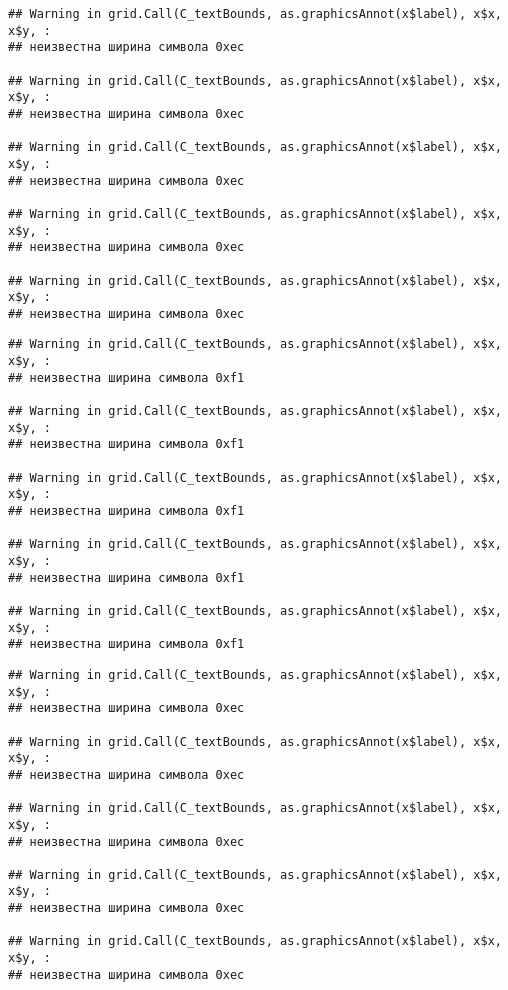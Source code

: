 \documentclass[
]{article}
\begin{document}
\begin{verbatim}
## Warning in grid.Call(C_textBounds, as.graphicsAnnot(x$label), x$x, x$y, :
## неизвестна ширина символа 0xec

## Warning in grid.Call(C_textBounds, as.graphicsAnnot(x$label), x$x, x$y, :
## неизвестна ширина символа 0xec

## Warning in grid.Call(C_textBounds, as.graphicsAnnot(x$label), x$x, x$y, :
## неизвестна ширина символа 0xec

## Warning in grid.Call(C_textBounds, as.graphicsAnnot(x$label), x$x, x$y, :
## неизвестна ширина символа 0xec

## Warning in grid.Call(C_textBounds, as.graphicsAnnot(x$label), x$x, x$y, :
## неизвестна ширина символа 0xec
\end{verbatim}

\begin{verbatim}
## Warning in grid.Call(C_textBounds, as.graphicsAnnot(x$label), x$x, x$y, :
## неизвестна ширина символа 0xf1

## Warning in grid.Call(C_textBounds, as.graphicsAnnot(x$label), x$x, x$y, :
## неизвестна ширина символа 0xf1

## Warning in grid.Call(C_textBounds, as.graphicsAnnot(x$label), x$x, x$y, :
## неизвестна ширина символа 0xf1

## Warning in grid.Call(C_textBounds, as.graphicsAnnot(x$label), x$x, x$y, :
## неизвестна ширина символа 0xf1

## Warning in grid.Call(C_textBounds, as.graphicsAnnot(x$label), x$x, x$y, :
## неизвестна ширина символа 0xf1
\end{verbatim}

\begin{verbatim}
## Warning in grid.Call(C_textBounds, as.graphicsAnnot(x$label), x$x, x$y, :
## неизвестна ширина символа 0xec

## Warning in grid.Call(C_textBounds, as.graphicsAnnot(x$label), x$x, x$y, :
## неизвестна ширина символа 0xec

## Warning in grid.Call(C_textBounds, as.graphicsAnnot(x$label), x$x, x$y, :
## неизвестна ширина символа 0xec

## Warning in grid.Call(C_textBounds, as.graphicsAnnot(x$label), x$x, x$y, :
## неизвестна ширина символа 0xec

## Warning in grid.Call(C_textBounds, as.graphicsAnnot(x$label), x$x, x$y, :
## неизвестна ширина символа 0xec
\end{verbatim}
\end{document}
